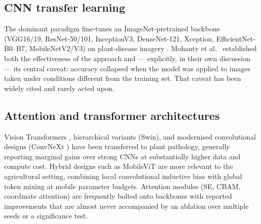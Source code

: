 \documentclass[10pt,twocolumn,a4paper]{article}
\begin{document}
\subsection{CNN transfer learning}
The dominant paradigm fine-tunes an ImageNet-pretrained backbone (VGG16/19, ResNet-50/101, InceptionV3, DenseNet-121, Xception, EfficientNet-B0--B7, MobileNetV2/V3) on plant-disease imagery \cite{mohanty2016,ferentinos2018}. Mohanty et al.\ \cite{mohanty2016} established both the effectiveness of the approach and --- explicitly, in their own discussion --- its central caveat: accuracy collapsed when the model was applied to images taken under conditions different from the training set. That caveat has been widely cited and rarely acted upon.

\subsection{Attention and transformer architectures}
Vision Transformers \cite{vit2021}, hierarchical variants (Swin), and modernised convolutional designs (ConvNeXt \cite{convnext2022}) have been transferred to plant pathology, generally reporting marginal gains over strong CNNs at substantially higher data and compute cost. Hybrid designs such as MobileViT \cite{mobilevit2022} are more relevant to the agricultural setting, combining local convolutional inductive bias with global token mixing at mobile parameter budgets. Attention modules (SE, CBAM, coordinate attention) are frequently bolted onto backbones with reported improvements that are almost never accompanied by an ablation over multiple seeds or a significance test.
\end{document}
